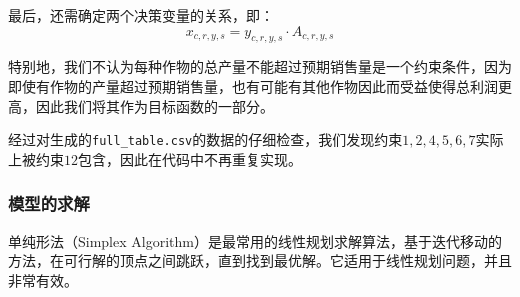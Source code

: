 \documentclass[withoutpreface]{cumcmthesis}
\begin{document}
最后，还需确定两个决策变量的关系，即：
\begin{equation}
    x_{c,r,y,s} = y_{c,r,y,s} \cdot A_{c,r,y,s}
\end{equation}



特别地，我们不认为每种作物的总产量不能超过预期销售量是一个约束条件，因为即使有作物的产量超过预期销售量，也有可能有其他作物因此而受益使得总利润更高，因此我们将其作为目标函数的一部分。

经过对生成的\verb|full_table.csv|的数据的仔细检查，我们发现约束$1,2,4,5,6,7$实际上被约束$12$包含，因此在代码中不再重复实现。


\subsubsection{模型的求解}
单纯形法（Simplex Algorithm）是最常用的线性规划求解算法，基于迭代移动的方法，在可行解的顶点之间跳跃，直到找到最优解。它适用于线性规划问题，并且非常有效。
\end{document}
